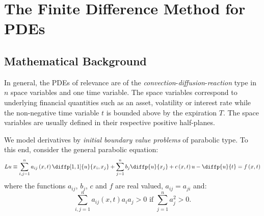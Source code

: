 \section{The Finite Difference Method for PDEs}
\subsection{Mathematical Background}

\begin{frame}[t]{\subsecname}
In general, the PDEs of relevance are of the \emph{convection}-\emph{diffusion}-\emph{reaction} type in $n$ space variables and one time variable. The space variables correspond to underlying financial quantities such as an asset, volatility or interest rate while the non-negative time variable $t$ is bounded above by the expiration $T$. The space variables are usually defined in their respective positive half-planes.

We model derivatives by \emph{initial boundary value problems} of parabolic type. To this end, consider the general parabolic equation:
\begin{equation}\label{eq:gpe}
Lu\equiv\sum_{i,j=1}^{n}a_{ij}\left(x,t\right)\diffp[1,1]{u}{x_{i},x_{j}}+\sum_{j=1}^{n}b_{j}\diffp{u}{x_{j}}+c\left(x,t\right)u-\diffp{u}{t}=f\left(x,t\right)
\end{equation}
where the functions $a_{ij}$, $b_{j}$, $c$ and $f$ are real valued, $a_{ij}=a_{ji}$ and:
\begin{equation}
\sum_{i,j=1}^{n}a_{ij}\left(x,t\right)a_{i}a_{j}>0\text{ if }\sum_{j=1}^{n}a^{2}_{j}>0.
\end{equation}
\end{frame}

